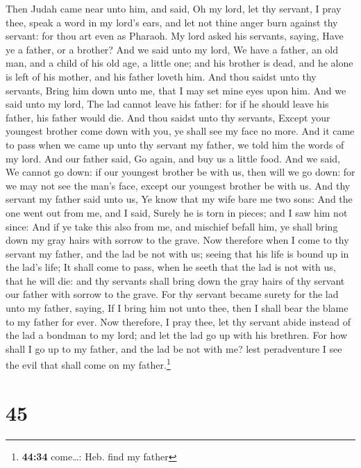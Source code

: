  Then Judah came near unto him, and said, Oh my lord, let
thy servant, I pray thee, speak a word in my lord's ears, and let not
thine anger burn against thy servant: for thou art even as Pharaoh.
 My lord asked his servants, saying, Have ye a father, or
a brother?  And we said unto my lord, We have a father,
an old man, and a child of his old age, a little one; and his brother is
dead, and he alone is left of his mother, and his father loveth him.
 And thou saidst unto thy servants, Bring him down unto
me, that I may set mine eyes upon him.  And we said unto
my lord, The lad cannot leave his father: for if he should leave his
father, his father would die.  And thou saidst unto thy
servants, Except your youngest brother come down with you, ye shall see
my face no more.  And it came to pass when we came up
unto thy servant my father, we told him the words of my lord.
 And our father said, Go again, and buy us a little food.
 And we said, We cannot go down: if our youngest brother
be with us, then will we go down: for we may not see the man's face,
except our youngest brother be with us.  And thy servant
my father said unto us, Ye know that my wife bare me two sons:
 And the one went out from me, and I said, Surely he is
torn in pieces; and I saw him not since:  And if ye take
this also from me, and mischief befall him, ye shall bring down my gray
hairs with sorrow to the grave.  Now therefore when I
come to thy servant my father, and the lad be not with us; seeing that
his life is bound up in the lad's life;  It shall come to
pass, when he seeth that the lad is not with us, that he will die: and
thy servants shall bring down the gray hairs of thy servant our father
with sorrow to the grave.  For thy servant became surety
for the lad unto my father, saying, If I bring him not unto thee, then I
shall bear the blame to my father for ever.  Now
therefore, I pray thee, let thy servant abide instead of the lad a
bondman to my lord; and let the lad go up with his brethren.
 For how shall I go up to my father, and the lad be not
with me? lest peradventure I see the evil that shall come on my
father.\footnote{\textbf{44:34} come\ldots: Heb. find my father}

\hypertarget{section-44}{%
\section{45}\label{section-44}}

